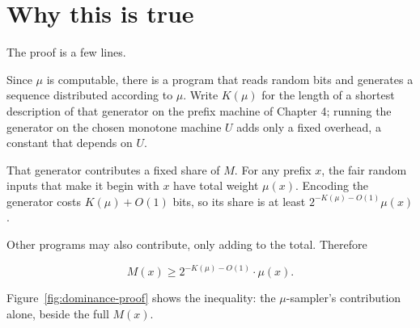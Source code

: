 \section*{Why this is true}

The proof is a few lines.

Since $\mu$ is computable, there is a program that reads random bits and generates a sequence distributed according to $\mu$. Write $K(\mu)$ for the length of a shortest description of that generator on the prefix machine of Chapter 4; running the generator on the chosen monotone machine $U$ adds only a fixed overhead, a constant that depends on $U$.

That generator contributes a fixed share of $M$. For any prefix $x$, the fair random inputs that make it begin with $x$ have total weight $\mu(x)$. Encoding the generator costs $K(\mu)+O(1)$ bits, so its share is at least $2^{-K(\mu)-O(1)}\mu(x)$.

Other programs may also contribute, only adding to the total. Therefore

$$M(x) \geq 2^{-K(\mu)-O(1)} \cdot \mu(x).$$

Figure~\ref{fig:dominance-proof} shows the inequality: the $\mu$-sampler's contribution alone, beside the full $M(x)$.


